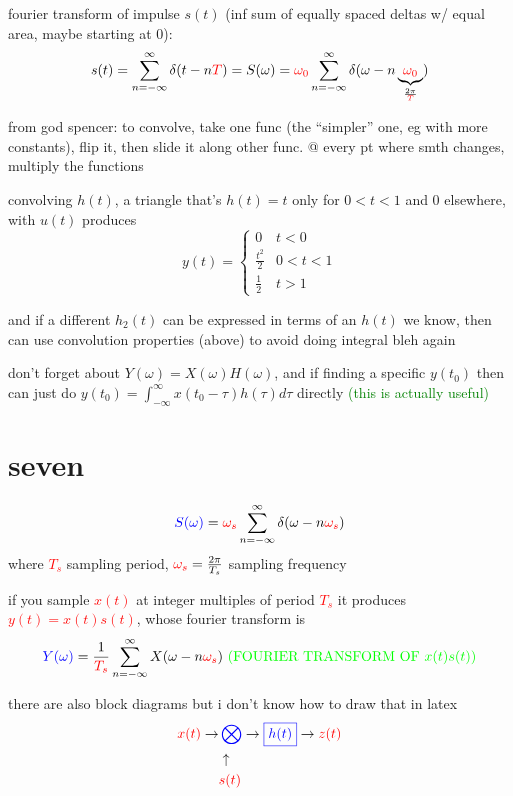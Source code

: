 \documentclass[a5paper, fleqn]{article}
\newcommand{\emf}[1]{\textcolor{red}{#1}}
\newcommand{\note}[1]{\textcolor{green}{#1}}
\newcommand{\eq}[1]{\textcolor{red}{$#1$}}
\newcommand{\wrap}{\hangpara{0.5cm}{1}}
\begin{document}
\wrap fourier transform of impulse $s(t)$ (inf sum of equally spaced deltas w/ equal area, maybe starting at 0):
\[s(t) = \sum_{n = -\infty}^\infty \delta(t - n\emf{T}) = S(\omega) = \emf{\omega_0} \sum_{n = -\infty}^\infty \delta(\omega - n\underbrace{\emf{\omega_0}}_{\frac{2\pi}{\emf{T}}})\]

\wrap from god spencer: to convolve, take one func (the ``simpler'' one, eg with more constants), flip it, then slide it along other func. @ every pt where smth changes, multiply the functions

\wrap convolving $h(t)$, a triangle that's $h(t) = t$ only for $0 < t < 1$ and 0 elsewhere, with $u(t)$ produces
\[y(t) = \begin{cases}
    0             & t < 0     \\
    \frac{t^2}{2} & 0 < t < 1 \\
    \frac{1}{2}   & t > 1
  \end{cases}\]

\wrap and if a different $h_2(t)$ can be expressed in terms of an $h(t)$ we know, then can use convolution properties (above) to avoid doing integral bleh again

\wrap don't forget about $Y(\omega) = X(\omega) H(\omega)$, and if finding a specific $y(t_0)$ then can just do $y(t_0) = \int_{-\infty}^\infty x(t_0 - \tau) h(\tau) d\tau$ directly \note{(this is actually useful)}

\section*{\textcolor{primary}{seven}}

\[\textcolor{blue}{S(\omega)} = \emf{\omega_s} \sum_{n = -\infty}^\infty \delta(\omega - n\emf{\omega_s})\]
where \eq{T_s} sampling period, $\emf{\omega_s} = \frac{2\pi}{T_s}$ sampling frequency

if you sample \eq{x(t)} at integer multiples of period \eq{T_s} it produces \eq{y(t) = x(t) s(t)}, whose fourier transform is
\[\textcolor{blue}{Y(\omega)} = \frac{1}{\emf{T_s}} \sum_{n = -\infty}^\infty X(\omega - n\emf{\omega_s}) ~ \note{\text{(FOURIER TRANSFORM OF $x(t) s(t)$)}}\]

there are also block diagrams but i don't know how to draw that in latex
\begin{align*}
  \emf{x(t)} \to & \,\textcolor{blue}{\bigotimes} \to \textcolor{blue}{\boxed{h(t)}} \to \emf{z(t)} \\
                 & \uparrow                                                                         \\
                 & \emf{s(t)}
\end{align*}
\end{document}
